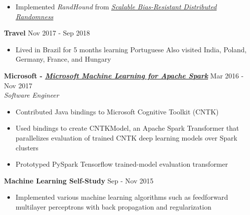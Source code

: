 \documentclass[overlapped]{res}
\begin{document}
\begin{resume}
\begin{itemize}
      \item Implemented {\em RandHound\/} from \href{Scalable Bias-Resistant Distributed Randomness}{\underline{{\em Scalable Bias-Resistant Distributed Randomness\/}}}
    \end{itemize}

    {\bf Travel} \hfill Nov 2017 - Sep 2018
    \begin{itemize} \itemsep-2pt
        \item
            Lived in Brazil for 5 months learning Portuguese
            Also visited India, Poland, Germany, France, and Hungary
    \end{itemize}


    {\bf Microsoft - \href{https://www.github.com/Azure/mmlspark}{\underline{\em Microsoft Machine Learning for Apache Spark}}} \hfill Mar 2016 - Nov 2017 \\
    {\em Software Engineer}
    \begin{itemize} \itemsep-2pt
        \item
          Contributed Java bindings to Microsoft Cognitive Toolkit (CNTK)
        \item
          Used bindings to create CNTKModel, an Apache Spark Transformer that parallelizes evaluation of trained CNTK deep learning models over Spark clusters
        \item
          Prototyped PySpark Tensorflow trained-model evaluation transformer
    \end{itemize}

    {\bf Machine Learning Self-Study} \hfill Sep - Nov 2015
    \begin{itemize} \itemsep-2pt
        \item
          Implemented various machine learning algorithms such as feedforward multilayer perceptrons with back propagation and regularization
    \end{itemize}



\end{resume}
\end{document}
